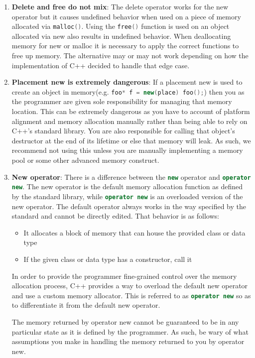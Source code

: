 \documentclass[letterpaper, 12pt]{article}
\newcommand{\inlinecode}[1]{\colorbox{codegrey}{\lstinline[language=C++]{#1}}}
\begin{document}
\begin{enumerate}
  \item {\bfseries Delete and free do not mix}:
  The delete operator works for the new operator but it causes undefined behavior when used 
  on a piece of memory allocated via \inlinecode{malloc()}. Using the \inlinecode{free()} function 
  is used on an object allocated via new also results in undefined behavior. When deallocating memory for 
  new or malloc it is necessary to apply the correct functions to free up memory. The alternative may or may not work
  depending on how the implementation of C++ decided to handle that edge case.
  
  \item {\bfseries Placement new is extremely dangerous}:
  If a placement new is used to create an object in memory(e.g. \inlinecode{foo* f = new(place) foo();}) 
  then you as the programmer are given sole responsibility for managing that memory location. This can
  be extremely dangerous as you have to account of platform alignment and memory allocation manually
  rather than being able to rely on C++'s standard library. You are also responsible for calling that
  object's destructor at the end of its lifetime or else that memory will leak. As such, we recommend 
  not using this unless you are manually implementing a memory pool or some other advanced memory construct.

  \item {\bfseries New operator}:
  There is a difference between the \inlinecode{new} operator and \inlinecode{operator new}. The new operator 
  is the default memory allocation function as defined by the standard library, while \inlinecode{operator new} 
  is an overloaded version of the new operator. The default operator always works in the way specified by
  the standard and cannot be directly edited. That behavior is as follows:
  \begin{itemize}
   \item It allocates a block of memory that can house the provided class or data type
   \item If the given class or data type has a constructor, call it
  \end{itemize}
  In order to provide the programmer fine-grained control over the memory allocation process, C++
  provides a way to overload the default new operator and use a custom memory allocator. This is referred to
  as \inlinecode{operator new} so as to differentiate it from the default new operator.
  \par\vspace{\baselineskip}
  The memory returned by operator new cannot be guaranteed to be in any particular state as it is 
  defined by the programmer. As such, be wary of what assumptions you make in handling the memory
  returned to you by operator new.


\end{enumerate}
\end{document}
